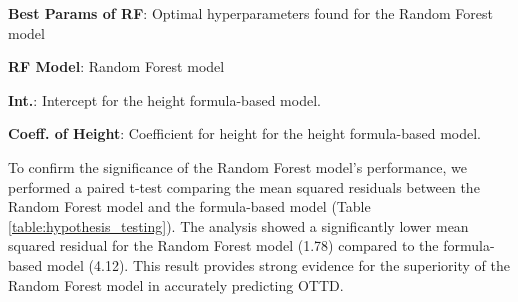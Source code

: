 \documentclass[11pt]{article}
\begin{document}
\begin{table}[h]
\caption{Best Parameters of RF Model.}
\label{table:RF_params}
\begin{threeparttable}
\renewcommand{\TPTminimum}{\linewidth}
\begin{tablenotes}
\footnotesize
\item \textbf{Best Params of RF}: Optimal hyperparameters found for the Random Forest model
\item \textbf{RF Model}: Random Forest model
\end{tablenotes}
\end{threeparttable}
\end{table}


\begin{table}[h]
\caption{Coefficients for Height Formula-Based Model.}
\label{table:height_formula_params}
\begin{threeparttable}
\renewcommand{\TPTminimum}{\linewidth}
\begin{tablenotes}
\footnotesize
\item \textbf{Int.}: Intercept for the height formula-based model.
\item \textbf{Coeff. of Height}: Coefficient for height for the height formula-based model.
\end{tablenotes}
\end{threeparttable}
\end{table}


To confirm the significance of the Random Forest model's performance, we performed a paired t-test comparing the mean squared residuals between the Random Forest model and the formula-based model (Table \ref{table:hypothesis_testing}). The analysis showed a significantly lower mean squared residual for the Random Forest model (1.78) compared to the formula-based model (4.12). This result provides strong evidence for the superiority of the Random Forest model in accurately predicting OTTD.
\end{document}
